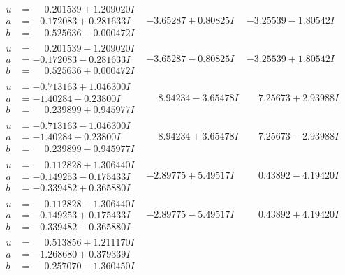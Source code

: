 \documentclass[1p]{elsarticle_modified}
\theoremstyle{definition}
\begin{document}
$$\begin{array}{c|c|c}
\begin{aligned}
u &= \phantom{-}0.201539 + 1.209020 I \\
a &= -0.172083 + 0.281633 I \\
b &= \phantom{-}0.525636 - 0.000472 I\end{aligned}
 & -3.65287 + 0.80825 I & -3.25539 - 1.80542 I \\ \hline\begin{aligned}
u &= \phantom{-}0.201539 - 1.209020 I \\
a &= -0.172083 - 0.281633 I \\
b &= \phantom{-}0.525636 + 0.000472 I\end{aligned}
 & -3.65287 - 0.80825 I & -3.25539 + 1.80542 I \\ \hline\begin{aligned}
u &= -0.713163 + 1.046300 I \\
a &= -1.40284 - 0.23800 I \\
b &= \phantom{-}0.239899 + 0.945977 I\end{aligned}
 & \phantom{-}8.94234 - 3.65478 I & \phantom{-}7.25673 + 2.93988 I \\ \hline\begin{aligned}
u &= -0.713163 - 1.046300 I \\
a &= -1.40284 + 0.23800 I \\
b &= \phantom{-}0.239899 - 0.945977 I\end{aligned}
 & \phantom{-}8.94234 + 3.65478 I & \phantom{-}7.25673 - 2.93988 I \\ \hline\begin{aligned}
u &= \phantom{-}0.112828 + 1.306440 I \\
a &= -0.149253 - 0.175433 I \\
b &= -0.339482 + 0.365880 I\end{aligned}
 & -2.89775 + 5.49517 I & \phantom{-}0.43892 - 4.19420 I \\ \hline\begin{aligned}
u &= \phantom{-}0.112828 - 1.306440 I \\
a &= -0.149253 + 0.175433 I \\
b &= -0.339482 - 0.365880 I\end{aligned}
 & -2.89775 - 5.49517 I & \phantom{-}0.43892 + 4.19420 I \\ \hline\begin{aligned}
u &= \phantom{-}0.513856 + 1.211170 I \\
a &= -1.268680 + 0.379339 I \\
b &= \phantom{-}0.257070 - 1.360450 I\end{aligned}

\end{array}$$
\end{document}

